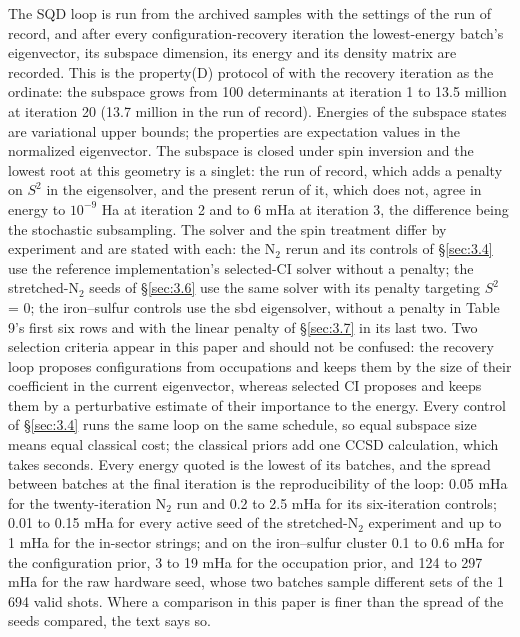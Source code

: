 \documentclass[11pt]{article}
\begin{document}
The SQD loop is run from the archived samples with the settings of the run of record, and after every configuration-recovery iteration the lowest-energy batch's eigenvector, its subspace dimension, its energy and its density matrix are recorded. This is the property(D) protocol of \cite{ECGseedingSQD} with the recovery iteration as the ordinate: the subspace grows from 100 determinants at iteration 1 to 13.5 million at iteration 20 (13.7 million in the run of record). Energies of the subspace states are variational upper bounds; the properties are expectation values in the normalized eigenvector. The subspace is closed under spin inversion and the lowest root at this geometry is a singlet: the run of record, which adds a penalty on $S^{2}$ in the eigensolver, and the present rerun of it, which does not, agree in energy to $10^{-9}$ Ha at iteration 2 and to 6 mHa at iteration 3, the difference being the stochastic subsampling. The solver and the spin treatment differ by experiment and are stated with each: the N$_2$ rerun and its controls of \S\ref{sec:3.4} use the reference implementation's selected-CI solver without a penalty; the stretched-N$_2$ seeds of \S\ref{sec:3.6} use the same solver with its penalty targeting $S^{2}$ = 0; the iron--sulfur controls use the sbd eigensolver, without a penalty in Table 9's first six rows and with the linear penalty of \S\ref{sec:3.7} in its last two. Two selection criteria appear in this paper and should not be confused: the recovery loop proposes configurations from occupations and keeps them by the size of their coefficient in the current eigenvector, whereas selected CI proposes and keeps them by a perturbative estimate of their importance to the energy. Every control of \S\ref{sec:3.4} runs the same loop on the same schedule, so equal subspace size means equal classical cost; the classical priors add one CCSD calculation, which takes seconds. Every energy quoted is the lowest of its batches, and the spread between batches at the final iteration is the reproducibility of the loop: 0.05 mHa for the twenty-iteration N$_2$ run and 0.2 to 2.5 mHa for its six-iteration controls; 0.01 to 0.15 mHa for every active seed of the stretched-N$_2$ experiment and up to 1 mHa for the in-sector strings; and on the iron--sulfur cluster 0.1 to 0.6 mHa for the configuration prior, 3 to 19 mHa for the occupation prior, and 124 to 297 mHa for the raw hardware seed, whose two batches sample different sets of the 1 694 valid shots. Where a comparison in this paper is finer than the spread of the seeds compared, the text says so.
\end{document}
